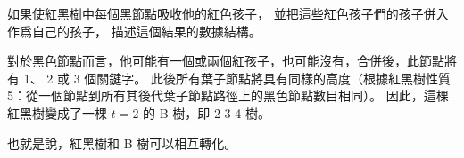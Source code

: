 \startEXERCISE
如果使紅黑樹中每個黑節點吸收他的紅色孩子，
並把這些紅色孩子們的孩子併入作爲自己的孩子，
描述這個結果的數據結構。
\stopEXERCISE

\startANSWER
對於黑色節點而言，他可能有一個或兩個紅孩子，也可能沒有，合併後，此節點將有 1、 2 或 3 個關鍵字。
此後所有葉子節點將具有同樣的高度（根據紅黑樹性質 5：從一個節點到所有其後代葉子節點路徑上的黑色節點數目相同）。
因此，這棵紅黑樹變成了一棵 $t=2$ 的 B 樹，即 2-3-4 樹。

也就是說，紅黑樹和 B 樹可以相互轉化。
\stopANSWER
